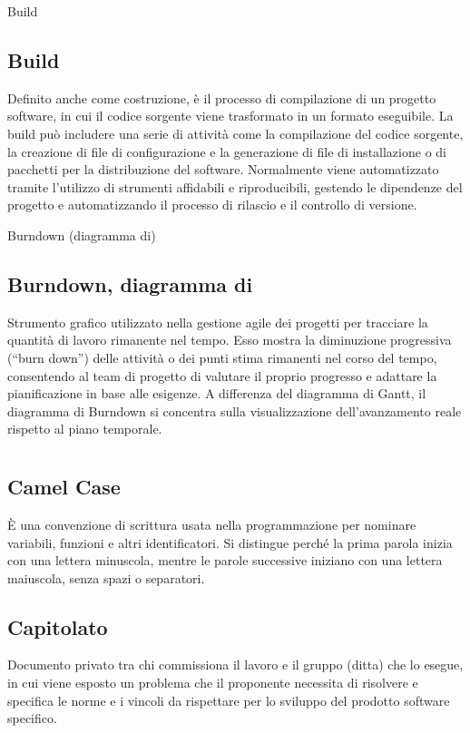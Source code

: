 \hypertarget{sec:build}{Build}
\subsection*{Build}
Definito anche come costruzione, è il processo di compilazione di un progetto software, in cui il codice sorgente viene trasformato in un 
formato eseguibile. La build può includere una serie di attività come la compilazione del codice sorgente, la creazione di file di 
configurazione e la generazione di file di installazione o di pacchetti per la distribuzione del software. Normalmente viene automatizzato 
tramite l’utilizzo di strumenti affidabili e riproducibili, gestendo le dipendenze del progetto e automatizzando il processo di rilascio e 
il controllo di versione.

\hypertarget{sec:diagramma_di_burndown}{Burndown (diagramma di)}
\subsection*{Burndown, diagramma di}
Strumento grafico utilizzato nella gestione agile dei progetti per tracciare la quantità di lavoro rimanente nel tempo. 
Esso mostra la diminuzione progressiva (“burn down”) delle attività o dei punti stima rimanenti nel corso del tempo, 
consentendo al team di progetto di valutare il proprio progresso e adattare la pianificazione in base alle esigenze. 
A differenza del diagramma di Gantt, il diagramma di Burndown si concentra sulla visualizzazione dell’avanzamento reale rispetto al piano temporale.

\newpage




\section{}

\hypertarget{sec:Camel Case}{}
\subsection*{Camel Case}
È una convenzione di scrittura usata nella programmazione per nominare variabili, funzioni e altri identificatori. 
Si distingue perché la prima parola inizia con una lettera minuscola, mentre le parole successive iniziano con una lettera maiuscola, senza spazi o separatori.

\hypertarget{sec:capitolato}{}
\subsection*{Capitolato}
Documento privato tra chi commissiona il lavoro e il gruppo (ditta) che lo esegue, in cui viene esposto un problema che il proponente necessita di risolvere 
e specifica le norme e i vincoli da rispettare per lo sviluppo del prodotto software specifico.

